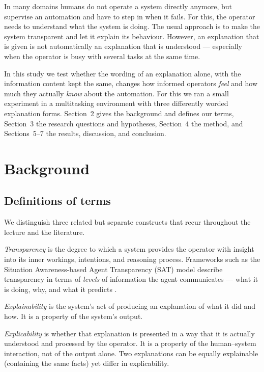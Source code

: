 \documentclass[10pt,twocolumn]{article}
\begin{document}
In many domains humans do not operate a system directly anymore, but supervise an automation and have to step in when it fails. For this, the operator needs to understand what the system is doing. The usual approach is to make the system transparent and let it explain its behaviour. However, an explanation that is given is not automatically an explanation that is understood --- especially when the operator is busy with several tasks at the same time.

In this study we test whether the wording of an explanation alone, with the information content kept the same, changes how informed operators \textit{feel} and how much they actually \textit{know} about the automation. For this we ran a small experiment in a multitasking environment with three differently worded explanation forms. Section~2 gives the background and defines our terms, Section~3 the research questions and hypotheses, Section~4 the method, and Sections~5--7 the results, discussion, and conclusion.

\section{Background}

\subsection{Definitions of terms}
We distinguish three related but separate constructs that recur throughout the lecture and the literature.

\textit{Transparency} is the degree to which a system provides the operator with insight into its inner workings, intentions, and reasoning process. Frameworks such as the Situation Awareness-based Agent Transparency (SAT) model describe transparency in terms of \textit{levels} of information the agent communicates --- what it is doing, why, and what it predicts \parencite{Chen2014,Mercado2016}.

\textit{Explainability} is the system's act of producing an explanation of what it did and how. It is a property of the system's output.

\textit{Explicability} is whether that explanation is presented in a way that it is actually understood and processed by the operator. It is a property of the human--system interaction, not of the output alone. Two explanations can be equally explainable (containing the same facts) yet differ in explicability.
\end{document}
